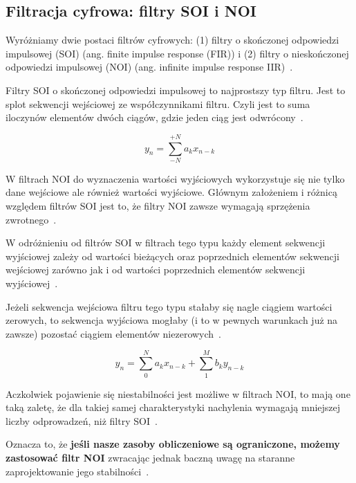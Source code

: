 \documentclass[wi]{zut}
\begin{document}
\subsection{Filtracja cyfrowa: filtry SOI i NOI}

Wyróżniamy dwie postaci filtrów cyfrowych: (1) filtry o skończonej odpowiedzi impulsowej (SOI) (ang. finite impulse response (FIR)) i (2) filtry o nieskończonej odpowiedzi impulsowej (NOI) (ang. infinite impulse response IIR)~\cite{Cariow_7}.

Filtry SOI o skończonej odpowiedzi impulsowej to najprostszy typ filtru. Jest to splot sekwencji wejściowej ze współczynnikami filtru. Czyli jest to suma iloczynów elementów dwóch ciągów, gdzie jeden ciąg jest odwrócony~\cite{Cariow_7}.

\begin{equation}
    y_{n}=\sum_{-N}^{+N} a_{k} x_{n-k}
\end{equation}

W filtrach NOI do wyznaczenia wartości wyjściowych wykorzystuje się nie tylko dane wejściowe ale również wartości wyjściowe. Głównym założeniem i różnicą względem filtrów SOI jest to, że filtry NOI zawsze wymagają sprzężenia zwrotnego~\cite{Cariow_7}.

W odróżnieniu od filtrów SOI w filtrach tego typu każdy element sekwencji wyjściowej zależy od wartości bieżących oraz poprzednich elementów sekwencji wejściowej zarówno jak i od wartości poprzednich elementów sekwencji wyjściowej~\cite{Cariow_7}.

Jeżeli sekwencja wejściowa filtru tego typu stałaby się nagle ciągiem wartości zerowych, to sekwencja wyjściowa mogłaby (i to w pewnych warunkach już na zawsze) pozostać ciągiem elementów niezerowych~\cite{Cariow_7}.

\begin{equation}
    y_{n}=\sum_{0}^{N} a_{k} x_{n-k}+\sum_{1}^{M} b_{k} y_{n-k}
\end{equation}

Aczkolwiek pojawienie się niestabilności jest możliwe w filtrach NOI, to mają one taką zaletę, że dla takiej samej charakterystyki nachylenia wymagają mniejszej liczby odprowadzeń, niż filtry SOI~\cite{Cariow_7}.

Oznacza to, że \textbf{jeśli nasze zasoby obliczeniowe są ograniczone, możemy zastosować filtr NOI} zwracając jednak baczną uwagę na staranne zaprojektowanie jego stabilności~\cite{Cariow_7}.
\end{document}
